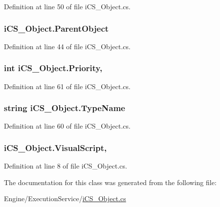 Definition at line 50 of file i\+C\+S\+\_\+\+Object.\+cs.

\hypertarget{classi_c_s___object_af737de0bca6d65d5a77ad1bc3d97666e}{
\subsubsection[{Parent\+Object}]{ i\+C\+S\+\_\+\+Object.\+Parent\+Object\hspace{0.3cm}{\ttfamily [get]}}}\label{classi_c_s___object_af737de0bca6d65d5a77ad1bc3d97666e}


Definition at line 44 of file i\+C\+S\+\_\+\+Object.\+cs.

\hypertarget{classi_c_s___object_a2aab03f2a4dead4aa88c54a8018c7f8d}{
\subsubsection[{Priority}]{\setlength{\rightskip}{0pt plus 5cm}int i\+C\+S\+\_\+\+Object.\+Priority\hspace{0.3cm}{\ttfamily [get]}, {\ttfamily [set]}}}\label{classi_c_s___object_a2aab03f2a4dead4aa88c54a8018c7f8d}


Definition at line 61 of file i\+C\+S\+\_\+\+Object.\+cs.

\hypertarget{classi_c_s___object_a0cd11b091b8f806281ad5333667eca28}{
\subsubsection[{Type\+Name}]{\setlength{\rightskip}{0pt plus 5cm}string i\+C\+S\+\_\+\+Object.\+Type\+Name\hspace{0.3cm}{\ttfamily [get]}}}\label{classi_c_s___object_a0cd11b091b8f806281ad5333667eca28}


Definition at line 60 of file i\+C\+S\+\_\+\+Object.\+cs.

\hypertarget{classi_c_s___object_a691ab14c3099acb192e266502ed533c2}{
\subsubsection[{Visual\+Script}]{ i\+C\+S\+\_\+\+Object.\+Visual\+Script\hspace{0.3cm}{\ttfamily [get]}, {\ttfamily [set]}}}\label{classi_c_s___object_a691ab14c3099acb192e266502ed533c2}


Definition at line 8 of file i\+C\+S\+\_\+\+Object.\+cs.



The documentation for this class was generated from the following file\+:\begin{DoxyCompactItemize}
\item 
Engine/\+Execution\+Service/\hyperlink{i_c_s___object_8cs}{i\+C\+S\+\_\+\+Object.\+cs}\end{DoxyCompactItemize}
